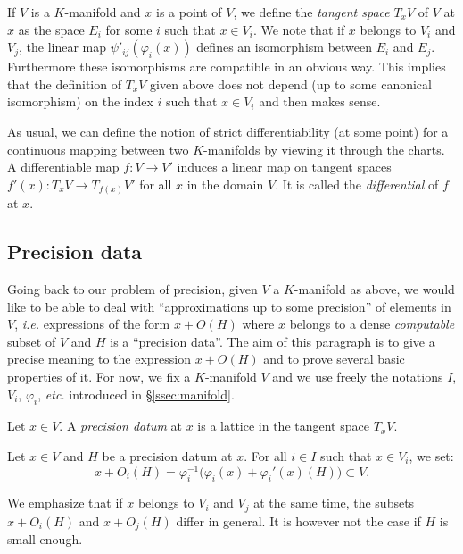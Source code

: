 \documentclass{lms}
\begin{document}
If $V$ is a $K$-manifold and $x$ is a point of $V$, we define the 
\emph{tangent space} $T_x V$ of $V$ at $x$ as the space $E_i$ for some 
$i$ such that $x \in V_i$. We note that if $x$ belongs to $V_i$ and 
$V_j$, the linear map $\psi'_{ij}(\varphi_i(x))$ defines an isomorphism 
between $E_i$ and $E_j$. Furthermore these isomorphisms are compatible 
in an obvious way. This implies that the definition of $T_x V$ given 
above does not depend (up to some canonical isomorphism) on the index 
$i$ such that $x \in V_i$ and then makes sense.

As usual, we can define the notion of strict differentiability (at some 
point) for a continuous mapping between two $K$-manifolds by viewing it 
through the charts. A  differentiable map $f : V \to V'$ induces 
a linear map on tangent spaces $f'(x) : T_x V \to T_{f(x)} V'$ for all 
$x$ in the domain $V$. It is called the \emph{differential} of $f$ at
$x$.

\subsection{Precision data}


Going back to our problem of precision, given $V$ a $K$-manifold as 
above, we would like to be able to deal with ``approximations up to some 
precision'' of elements in $V$, \emph{i.e.} expressions of the form $x + 
O(H)$ where $x$ belongs to a dense \emph{computable} subset of $V$ and 
$H$ is a ``precision data''.
The aim of this paragraph is to give a precise meaning to the expression 
$x + O(H)$ and to prove several basic properties of it.
For now, we fix a $K$-manifold $V$ and we use freely the notations $I$, 
$V_i$, $\varphi_i$, \emph{etc.} introduced in \S \ref{ssec:manifold}.

\begin{deftn}
Let $x \in V$. 
A \emph{precision datum} at $x$ is a lattice in the tangent space 
$T_x V$.
\end{deftn}

\begin{deftn}
Let $x \in V$ and $H$ be a precision datum at $x$.
For all $i \in I$ such that $x \in V_i$, we set:
$$x + O_i(H) = \varphi_i^{-1}\big(\varphi_i(x) + \varphi_i'(x)(H)\big) 
\subset V.$$
\end{deftn}

We emphasize that if $x$ belongs to $V_i$ and $V_j$ at the same time,
the subsets $x + O_i(H)$ and $x + O_j(H)$ differ in general. It is 
however not the case if $H$ is small enough.
\end{document}
